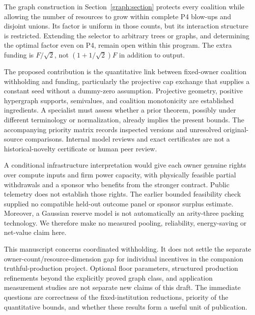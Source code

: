 The graph construction in Section~\ref{graph:section} protects every coalition
while allowing the number of resources to grow within complete P4 blow-ups and
disjoint unions. Its factor is uniform in those counts, but its interaction
structure is restricted. Extending the selector to arbitrary trees or graphs,
and determining the optimal factor even on P4, remain open within this program.
The extra funding is $F/\sqrt2$, not $(1+1/\sqrt2)F$ in addition to output.

The proposed contribution is the quantitative link between fixed-owner
coalition withholding and funding, particularly the projective cap exchange
that supplies a constant seed without a dummy-zero assumption. Projective
geometry, positive hypergraph supports, semivalues, and coalition monotonicity
are established ingredients. A specialist must assess whether a prior theorem,
possibly under different terminology or normalization, already implies the
present bounds. The accompanying priority matrix records inspected versions
and unresolved original-source comparisons. Internal model reviews and exact
certificates are not a historical-novelty certificate or human peer review.

A conditional infrastructure interpretation would give each owner genuine
rights over compute inputs and firm power capacity, with physically feasible
partial withdrawals and a sponsor who benefits from the stronger contract.
Public telemetry does not establish those rights. The earlier bounded
feasibility check supplied no compatible held-out outcome panel or sponsor
surplus estimate. Moreover, a Gaussian reserve model is not automatically an
arity-three packing technology. We therefore make no measured pooling,
reliability, energy-saving or net-value claim here.

This manuscript concerns coordinated withholding. It does not settle the
separate owner-count/resource-dimension gap for individual incentives in the
companion truthful-production project. Optional floor parameters, structured
production refinements beyond the explicitly proved graph class, and application
measurement studies are not separate new claims of this draft. The immediate questions are correctness of the
fixed-institution reductions, priority of the quantitative bounds, and whether
these results form a useful unit of publication.
